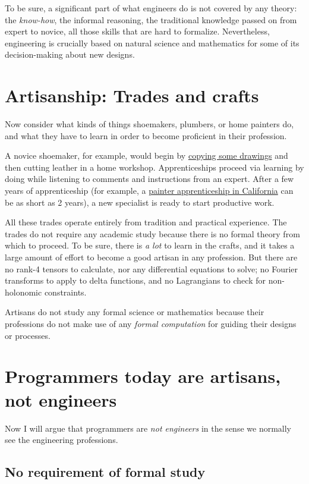 To be sure, a significant part of what engineers do is not covered
by any theory: the \emph{know-how}, the informal reasoning, the traditional
knowledge passed on from expert to novice,  \textendash{}  all those
skills that are hard to formalize. Nevertheless, engineering is crucially
based on natural science and mathematics for some of its decision-making
about new designs.

\section{Artisanship: Trades and crafts }

Now consider what kinds of things shoemakers, plumbers, or home painters
do, and what they have to learn in order to become proficient in their
profession.

A novice shoemaker, for example, would begin by \href{https://youtu.be/cY5MY0czMAk?t=141}{copying some drawings}
and then cutting leather in a home workshop. Apprenticeships proceed
via learning by doing while listening to comments and instructions
from an expert. After a few years of apprenticeship (for example,
a \href{http://www.calapprenticeship.org/programs/painter_apprenticeship.php}{painter apprenticeship in California}
can be as short as 2 years), a new specialist is ready to start productive
work. 

All these trades operate entirely from tradition and practical experience.
The trades do not require any academic study because there is no formal
theory from which to proceed. To be sure, there is \emph{a lot} to
learn in the crafts, and it takes a large amount of effort to become
a good artisan in any profession. But there are no rank-4 tensors
to calculate, nor any differential equations to solve; no Fourier
transforms to apply to delta functions, and no Lagrangians to check
for non-holonomic constraints.

Artisans do not study any formal science or mathematics because their
professions do not make use of any \emph{formal computation} for guiding
their designs or processes.

\section{Programmers today are artisans, not engineers }

Now I will argue that programmers are \emph{not engineers} in the
sense we normally see the engineering professions.

\subsection{No requirement of formal study }

